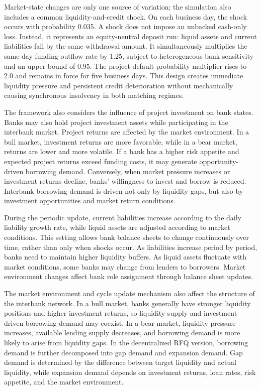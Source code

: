 Market-state changes are only one source of variation; the simulation
also includes a common liquidity-and-credit shock. On each business day,
the shock occurs with probability 0.035. A shock does not impose an
unbacked cash-only loss. Instead, it represents an equity-neutral deposit
run: liquid assets and current liabilities fall by the same withdrawal
amount. It simultaneously multiplies the same-day funding-outflow rate by
1.25, subject to heterogeneous bank sensitivity and an upper bound of
0.95. The project-default-probability multiplier rises to 2.0 and remains
in force for five business days. This design creates immediate liquidity
pressure and persistent credit deterioration without mechanically causing
synchronous insolvency in both matching regimes.

The framework also considers the influence of project investment on bank
states. Banks may also hold project investment assets while
participating in the interbank market. Project returns are affected by
the market environment. In a bull market, investment returns are more
favorable, while in a bear market, returns are lower and more volatile.
If a bank has a higher risk appetite and expected project returns exceed
funding costs, it may generate opportunity-driven borrowing demand.
Conversely, when market pressure increases or investment returns
decline, banks' willingness to invest and borrow is reduced. Interbank
borrowing demand is driven not only by liquidity gaps, but also by
investment opportunities and market return conditions.

During the periodic update, current liabilities increase according to
the daily liability growth rate, while liquid assets are adjusted
according to market conditions. This setting allows bank balance sheets
to change continuously over time, rather than only when shocks occur. As
liabilities increase period by period, banks need to maintain higher
liquidity buffers. As liquid assets fluctuate with market conditions,
some banks may change from lenders to borrowers. Market environment
changes affect bank role assignment through balance sheet updates.

The market environment and cycle update mechanism also affect the
structure of the interbank network. In a bull market, banks generally
have stronger liquidity positions and higher investment returns, so
liquidity supply and investment-driven borrowing demand may coexist. In
a bear market, liquidity pressure increases, available lending supply
decreases, and borrowing demand is more likely to arise from liquidity
gaps. In the decentralized RFQ version, borrowing demand is further
decomposed into gap demand and expansion demand. Gap demand is
determined by the difference between target liquidity and actual
liquidity, while expansion demand depends on investment returns, loan
rates, risk appetite, and the market environment.


